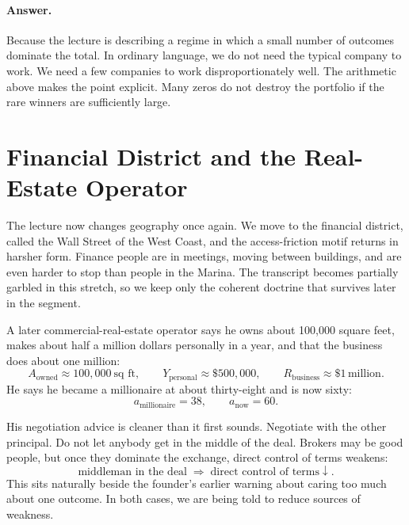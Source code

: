 \paragraph{Answer.} Because the lecture is describing a regime in which a small number of outcomes dominate the total. In ordinary language, we do not need the typical company to work. We need a few companies to work disproportionately well. The arithmetic above makes the point explicit. Many zeros do not destroy the portfolio if the rare winners are sufficiently large.

\section{Financial District and the Real-Estate Operator}

The lecture now changes geography once again. We move to the financial district, called the Wall Street of the West Coast, and the access-friction motif returns in harsher form. Finance people are in meetings, moving between buildings, and are even harder to stop than people in the Marina. The transcript becomes partially garbled in this stretch, so we keep only the coherent doctrine that survives later in the segment.

A later commercial-real-estate operator says he owns about 100,000 square feet, makes about half a million dollars personally in a year, and that the business does about one million:
\begin{equation}
A_{\text{owned}} \approx 100{,}000\ \text{sq ft},\qquad
Y_{\text{personal}} \approx \$500{,}000,\qquad
R_{\text{business}} \approx \$1\,\text{million}.
\end{equation}
He says he became a millionaire at about thirty-eight and is now sixty:
\begin{equation}
a_{\text{millionaire}}=38,\qquad
a_{\text{now}}=60.
\end{equation}

His negotiation advice is cleaner than it first sounds. Negotiate with the other principal. Do not let anybody get in the middle of the deal. Brokers may be good people, but once they dominate the exchange, direct control of terms weakens:
\begin{equation}
\text{middleman in the deal} \;\Rightarrow\; \text{direct control of terms}\downarrow.
\end{equation}
This sits naturally beside the founder's earlier warning about caring too much about one outcome. In both cases, we are being told to reduce sources of weakness.

